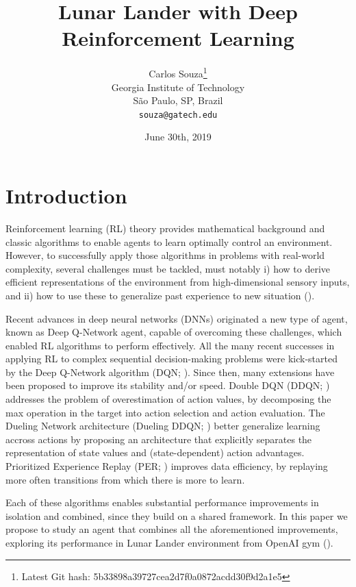 \documentclass{article}
\title{Lunar Lander with Deep Reinforcement Learning}
\date{June 30th, 2019}
\author{
Carlos Souza\thanks{Latest Git hash: 5b33898a39727cea2d7f0a0872acdd30f9d2a1e5}\\
Georgia Institute of Technology\\
São Paulo, SP, Brazil \\
\texttt{souza@gatech.edu} \\
}
\begin{document}
    \maketitle



    \section{Introduction}
    \label{sec:introduction}
    Reinforcement learning (RL) theory provides mathematical background and classic algorithms to enable agents to learn optimally control an environment.
    However, to successfully apply those algorithms in problems with real-world complexity, several challenges must be tackled, must notably i) how to derive efficient representations of the environment from high-dimensional sensory inputs, and ii) how to use these to generalize past experience to new situation (\cite{dqn}).

    Recent advances in deep neural networks (DNNs) originated a new type of agent, known as Deep Q-Network agent, capable of overcoming these challenges, which enabled RL algorithms to perform effectively.
    All the many recent successes in applying RL to complex sequential decision-making problems were kick-started by the Deep Q-Network algorithm (DQN; \cite{dqn}).
    Since then, many extensions have been proposed to improve its stability and/or speed.
Double DQN (DDQN; \cite{ddqn}) addresses the problem of overestimation of action values, by decomposing the max operation in the target into action selection and action evaluation.
    The Dueling Network architecture (Dueling DDQN; \cite{dueling}) better generalize learning accross actions by proposing an architecture that explicitly separates the representation of state values and (state-dependent) action advantages.
    Prioritized Experience Replay (PER; \cite{per}) improves data efficiency, by replaying more often transitions from which there is more to learn.

    Each of these algorithms enables substantial performance improvements in isolation and combined, since they build on a shared framework.
    In this paper we propose to study an agent that combines all the aforementioned improvements, exploring its performance in Lunar Lander environment from OpenAI gym (\cite{openai}).
\end{document}
